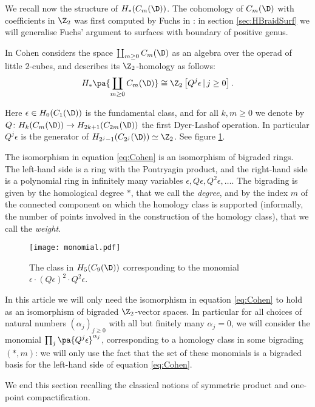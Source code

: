 We recall now the structure of $H_*(C_m(\D))$.
The cohomology of $C_m(\D)$ with coefficients in $\Z_2$ was first computed by Fuchs in
\cite{Fuchs:CohomBraidModtwo}: in section
\ref{sec:HBraidSurf} we will generalise  Fuchs' argument to surfaces with boundary of positive genus.

In \cite[Chap.III]{CLM} Cohen considers the space $\coprod_{m\geq 0}C_m(\D)$ as an
algebra over the operad of little $2$-cubes, and describes its
$\Z_2$-homology as follows:
\begin{equation}
 \label{eq:Cohen}
H_*\pa{\coprod_{m\geq 0}C_m(\D)}\cong \Z_2\left[Q^j\epsilon \, |\, j\geq 0\right].
\end{equation}

Here $\epsilon\in H_0(C_1(\D))$ is the fundamental class, and for all
$k,m\geq 0$ we denote by $Q\colon H_k(C_m(\D))\to H_{2k+1}(C_{2m}(\D))$
the first Dyer-Lashof operation. In particular $Q^j\epsilon$ is the generator of
$H_{2^j-1}(C_{2^j}(\D))\simeq\Z_2$. See figure \ref{fig:monomial}.

The isomorphism in equation \eqref{eq:Cohen} is
an isomorphism of bigraded rings. The left-hand side is a ring with the Pontryagin product,
and the right-hand side is a polynomial ring in infinitely many variables $\epsilon,Q\epsilon,Q^2\epsilon,\dots$.
The bigrading is given by the homological degree
$*$, that we call the \emph{degree},
and by the index $m$ of the connected component
on which the homology class is supported (informally, the number of points
involved in the construction of the homology class), that we call the \emph{weight}.

 \begin{figure}\centering
 \texttt{[image: monomial.pdf]}
 \caption{The class in $H_5(C_9(\D))$ corresponding to the monomial $\epsilon\cdot(Q\epsilon)^2\cdot Q^2\epsilon$.}
\label{fig:monomial}
\end{figure}

In this article we will only need the isomorphism in equation \eqref{eq:Cohen} to hold as
an isomorphism of bigraded $\Z_2$-vector spaces.
In particular for all choices of natural numbers $(\alpha_j)_{j\geq 0}$ with all but finitely
many $\alpha_j=0$, we will consider the monomial $\prod_j\pa{Q^j\epsilon}^{\alpha_j}$, corresponding to
a homology class in some bigrading $(*,m)$: we will only use the fact
that the set of these monomials is a bigraded basis for the
left-hand side of equation \eqref{eq:Cohen}.

We end this section recalling the classical notions of symmetric product and one-point compactification.

